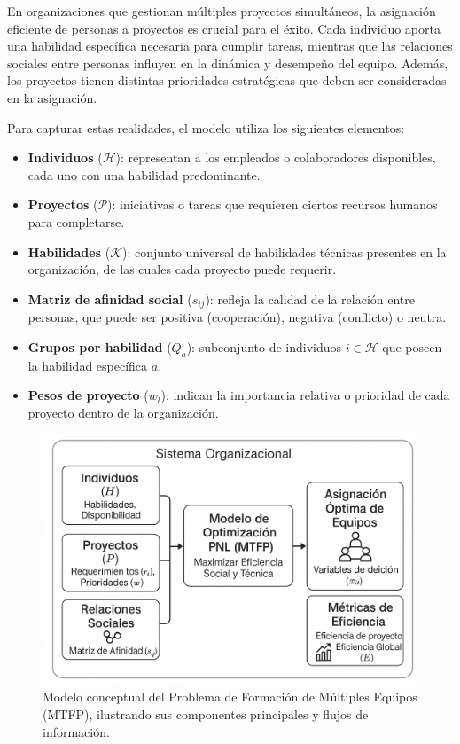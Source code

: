 \documentclass[conference]{IEEEtran}
\begin{document}
En organizaciones que gestionan múltiples proyectos simultáneos, la asignación eficiente de personas a proyectos es crucial para el éxito. Cada individuo aporta una habilidad específica necesaria para cumplir tareas, mientras que las relaciones sociales entre personas influyen en la dinámica y desempeño del equipo. Además, los proyectos tienen distintas prioridades estratégicas que deben ser consideradas en la asignación.

Para capturar estas realidades, el modelo utiliza los siguientes elementos:

\begin{itemize}
    \item \textbf{Individuos} (\(\mathcal{H}\)): representan a los empleados o colaboradores disponibles, cada uno con una habilidad predominante.
    \item \textbf{Proyectos} (\(\mathcal{P}\)): iniciativas o tareas que requieren ciertos recursos humanos para completarse.
    \item \textbf{Habilidades} (\(\mathcal{K}\)): conjunto universal de habilidades técnicas presentes en la organización, de las cuales cada proyecto puede requerir.
    \item \textbf{Matriz de afinidad social} (\(s_{ij}\)): refleja la calidad de la relación entre personas, que puede ser positiva (cooperación), negativa (conflicto) o neutra.
    \item \textbf{Grupos por habilidad} (\(Q_a\)): subconjunto de individuos \(i \in \mathcal{H}\) que poseen la habilidad específica \(a\).
    \item \textbf{Pesos de proyecto} (\(w_l\)): indican la importancia relativa o prioridad de cada proyecto dentro de la organización.
\end{itemize}


\begin{figure}[htbp]
    \centering
    \includegraphics[width=0.8\linewidth]{diagrama_conceptual_mtfp.png}
    \caption{Modelo conceptual del Problema de Formación de Múltiples Equipos (MTFP), ilustrando sus componentes principales y flujos de información.}
    \label{fig:conceptual_model}
\end{figure}
\end{document}
